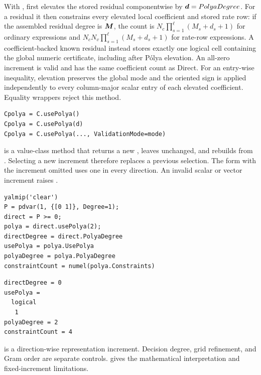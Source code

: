 With ,  first elevates the stored residual componentwise by $\boldsymbol{d}=PolyaDegree$. For a  residual it then constrains every elevated local coefficient and stored rate row: if the assembled residual degree is $\boldsymbol{M}$, the count is $N_c\prod_{s=1}^{\ell}(M_s+d_s+1)$ for ordinary expressions and $N_cN_v\prod_{s=1}^{\ell}(M_s+d_s+1)$ for rate-row expressions. A coefficient-backed known  residual instead stores exactly one logical cell containing the global numeric certificate, including after P\'olya elevation. An all-zero increment is valid and has the same coefficient count as Direct. For an entry-wise  inequality, elevation preserves the global mode and the oriented sign is applied independently to every column-major scalar entry of each elevated coefficient. Equality wrappers reject this method.

\syntaxhead
\begin{lstlisting}[style=dpsyntax]
Cpolya = C.usePolya()
Cpolya = C.usePolya(d)
Cpolya = C.usePolya(..., ValidationMode=mode)
\end{lstlisting}

 is a value-class method that returns a new , leaves  unchanged, and rebuilds from . Selecting a new increment therefore replaces a previous selection. The form with the increment omitted uses one in every direction. An invalid scalar or vector increment raises .

\examplehead
\begin{lstlisting}[style=dpmatlab]
yalmip('clear')
P = pdvar(1, {[0 1]}, Degree=1);
direct = P >= 0;
polya = direct.usePolya(2);
directDegree = direct.PolyaDegree
usePolya = polya.UsePolya
polyaDegree = polya.PolyaDegree
constraintCount = numel(polya.Constraints)
\end{lstlisting}

\begin{lstlisting}[style=dpoutput]
directDegree = 0
usePolya =
  logical
   1
polyaDegree = 2
constraintCount = 4
\end{lstlisting}

 is a direction-wise representation increment. Decision degree, grid refinement, and Gram order are separate controls.  gives the mathematical interpretation and fixed-increment limitations.

